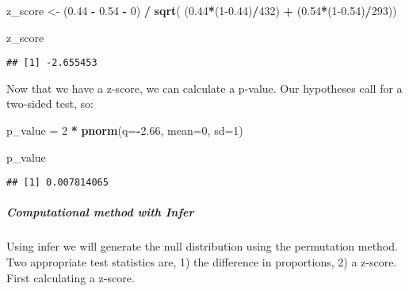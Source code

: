 \documentclass[]{article}
\newenvironment{Shaded}{\begin{snugshade}}{\end{snugshade}}
\newcommand{\DataTypeTok}[1]{\textcolor[rgb]{0.13,0.29,0.53}{#1}}
\newcommand{\DecValTok}[1]{\textcolor[rgb]{0.00,0.00,0.81}{#1}}
\newcommand{\FloatTok}[1]{\textcolor[rgb]{0.00,0.00,0.81}{#1}}
\newcommand{\KeywordTok}[1]{\textcolor[rgb]{0.13,0.29,0.53}{\textbf{#1}}}
\newcommand{\NormalTok}[1]{#1}
\newcommand{\OperatorTok}[1]{\textcolor[rgb]{0.81,0.36,0.00}{\textbf{#1}}}
\newcommand{\StringTok}[1]{\textcolor[rgb]{0.31,0.60,0.02}{#1}}
\let\oldsubparagraph\subparagraph
\renewcommand{\subparagraph}[1]{\oldsubparagraph{#1}\mbox{}}
\begin{document}
\begin{Shaded}
\begin{Highlighting}[]
\NormalTok{z_score <-}\StringTok{ }\NormalTok{(}\FloatTok{0.44} \OperatorTok{-}\StringTok{ }\FloatTok{0.54} \OperatorTok{-}\StringTok{ }\DecValTok{0}\NormalTok{) }\OperatorTok{/}\StringTok{ }\KeywordTok{sqrt}\NormalTok{( (}\FloatTok{0.44}\OperatorTok{*}\NormalTok{(}\DecValTok{1}\FloatTok{-0.44}\NormalTok{)}\OperatorTok{/}\DecValTok{432}\NormalTok{) }\OperatorTok{+}\StringTok{ }\NormalTok{(}\FloatTok{0.54}\OperatorTok{*}\NormalTok{(}\DecValTok{1}\FloatTok{-0.54}\NormalTok{)}\OperatorTok{/}\DecValTok{293}\NormalTok{))}

\NormalTok{z_score}
\end{Highlighting}
\end{Shaded}

\begin{verbatim}
## [1] -2.655453
\end{verbatim}

Now that we have a z-score, we can calculate a p-value. Our hypotheses
call for a two-sided test, so:

\begin{Shaded}
\begin{Highlighting}[]
\NormalTok{p_value =}\StringTok{ }\DecValTok{2} \OperatorTok{*}\StringTok{ }\KeywordTok{pnorm}\NormalTok{(}\DataTypeTok{q=}\OperatorTok{-}\FloatTok{2.66}\NormalTok{, }\DataTypeTok{mean=}\DecValTok{0}\NormalTok{, }\DataTypeTok{sd=}\DecValTok{1}\NormalTok{)}

\NormalTok{p_value}
\end{Highlighting}
\end{Shaded}

\begin{verbatim}
## [1] 0.007814065
\end{verbatim}

\hypertarget{computational-method-with-infer-1}{%
\subparagraph{Computational method with
Infer}\label{computational-method-with-infer-1}}

Using infer we will generate the null distribution using the permutation
method. Two appropriate test statistics are, 1) the difference in
proportions, 2) a z-score. First calculating a z-score.

\begin{Shaded}
\end{Shaded}
\end{document}
